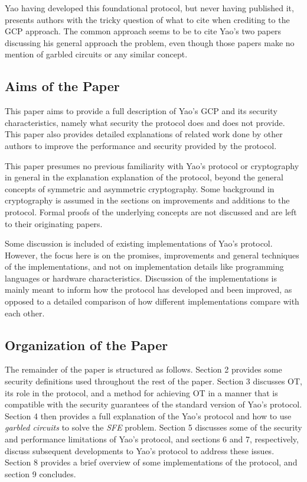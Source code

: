 Yao having developed this foundational protocol, but never having published it, presents authors with the tricky question of what to cite when crediting to the \ac{GCP} approach.  The common approach seems to be to cite Yao's two papers discussing his general approach the problem, even though those papers make no mention of garbled circuits or any similar concept.

\subsection{Aims of the Paper}

This paper aims to provide a full description of Yao's \ac{GCP} and its security characteristics, namely what security the protocol does and does not provide.  This paper also provides detailed explanations of related work done by other authors to improve the performance and security provided by the protocol.

This paper presumes no previous familiarity with Yao's protocol or cryptography in general in the explanation explanation of the protocol, beyond the general concepts of symmetric and asymmetric cryptography.  Some background in cryptography is assumed in the sections on improvements and additions to the protocol.  Formal proofs of the underlying concepts are not discussed and are left to their originating papers.

Some discussion is included of existing implementations of Yao's protocol. However, the focus here is on the promises, improvements and general techniques of the implementations, and not on implementation details like programming languages or hardware characteristics. Discussion of the implementations is mainly meant to inform how the protocol has developed and been improved, as opposed to a detailed comparison of how different implementations compare with each other.

\subsection{Organization of the Paper}

The remainder of the paper is structured as follows. Section 2 provides some security definitions used throughout the rest of the paper. Section 3 discusses \ac{OT}, its role in the protocol, and a method for achieving \ac{OT} in a manner that is compatible with the security guarantees of the standard version of Yao's protocol.  Section 4 then provides a full explanation of the Yao's protocol and how to use \emph{garbled circuits} to solve the \emph{SFE} problem. Section 5 discusses some of the security and performance limitations of Yao's protocol, and sections 6 and 7, respectively, discuss subsequent developments to Yao's protocol to address these issues. Section 8 provides a brief overview of some implementations of the protocol, and section 9 concludes.
